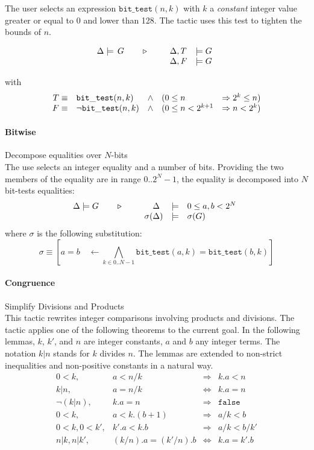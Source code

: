 The user selects an expression $\mathtt{bit\_test}(n,k)$ with $k$
a \emph{constant} integer value greater or equal to 0 and lower than
128. The tactic uses this test to tighten the bounds of $n$.

$$\TACTIC{\Delta\models\,G}{%
\begin{array}[t]{ll}
\Delta,T &\models G \\
\Delta,F &\models G
\end{array}} $$

with
$$\begin{array}[t]{rlcll}
  T \equiv & \mathtt{bit\_test}(n,k) & \wedge & (0 \leq n & \Rightarrow 2^{k} \leq n) \\
  F \equiv & \neg \mathtt{bit\_test}(n,k) & \wedge & (0 \leq n < 2^{k+1} & \Rightarrow n < 2^{k})
  \end{array}
$$

\paragraph{Bitwise} Decompose equalities over $N$-bits\\
The use selects an integer equality and a number of bits.
Providing the two members of the equality are in range $0..2^N-1$,
the equality is decomposed into $N$ bit-tests equalities:
\[\TACTIC{\Delta\models G}{%
\begin{array}[t]{rcl}
\Delta\phantom{)} &\models & 0 \leq a,b < 2^N \\
\sigma(\Delta) & \models & \sigma(G)
\end{array}
}\]
where $\sigma$ is the following substitution:
\[ \sigma \equiv
\left[ a=b \quad \leftarrow
\bigwedge_{k\in 0..N-1} \mathtt{bit\_test}(a,k) = \mathtt{bit\_test}(b,k)
\right]
\]

\paragraph{Congruence} Simplify Divisions and Products \\
This tactic rewrites integer comparisons involving products and divisions.
The tactic applies one of the following theorems to the current goal.
In the following lemmas, $k$, $k'$, and $n$ are integer constants, $a$ and $b$ any integer terms.
The notation $k|n$ stands for $k$ divides $n$.
The lemmas are extended to non-strict inequalities and non-positive constants in a natural way.
\[
\begin{array}{crcl}
0<k, & a < n/k &\Longrightarrow& k.a < n \\
k|n, & a = n/k &\Longleftrightarrow& k.a = n \\
\neg(k|n), & k.a = n & \Longrightarrow & \mathtt{false} \\
0<k, & a < k.(b+1) &\Longrightarrow& a/k < b \\
0<k, 0<k', & k'.a < k.b &\Longrightarrow& a/k < b/k' \\
n|k, n|k', & (k/n).a = (k'/n).b &\Longleftrightarrow& k.a = k'.b
\end{array}
\]

